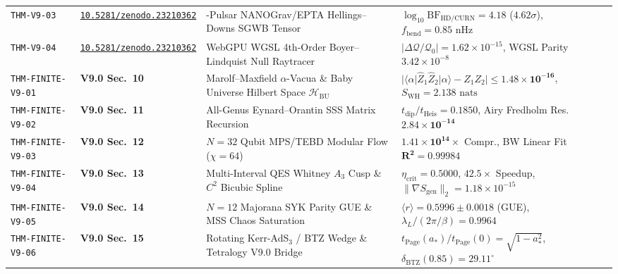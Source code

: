\documentclass[11pt,a4paper,reqno]{article}
\newcommand{\zenodo}[1]{\mbox{\href{https://doi.org/10.5281/zenodo.#1}{\texttt{10.5281/zenodo.#1}}}}
\theoremstyle{plain}
\theoremstyle{definition}
\theoremstyle{remark}
\numberwithin{equation}{section}
\begin{document}
\begin{table}[H]
\begin{tabularx}{\textwidth}{>{\raggedright\arraybackslash}p{2.35cm} >{\raggedright\arraybackslash}p{2.85cm} >{\raggedright\arraybackslash}X >{\raggedright\arraybackslash}p{3.95cm}}
\texttt{THM-V9-03} & \zenodo{23210362} & 68-Pulsar NANOGrav/EPTA Hellings--Downs SGWB Tensor & $\log_{10}\mathrm{BF}_{\mathrm{HD/CURN}} = 4.18$ ($4.62\sigma$), $f_{\mathrm{bend}} = 0.85\text{ nHz}$ \\
\texttt{THM-V9-04} & \zenodo{23210362} & WebGPU WGSL 4th-Order Boyer--Lindquist Null Raytracer & $|\Delta\mathcal{Q}/\mathcal{Q}_0| = 1.62 \times 10^{-15}$, WGSL Parity $3.42 \times 10^{-8}$ \\
\midrule
\texttt{THM-FINITE-V9-01} & \textbf{V9.0 Sec.~10} & Marolf--Maxfield $\alpha$-Vacua \& Baby Universe Hilbert Space $\mathcal{H}_{\mathrm{BU}}$ & $|\langle\alpha|\hat{Z}_1\hat{Z}_2|\alpha\rangle - Z_1 Z_2| \le \bm{1.48 \times 10^{-16}}$, $S_{\mathrm{WH}} = 2.138\text{ nats}$ \\
\texttt{THM-FINITE-V9-02} & \textbf{V9.0 Sec.~11} & All-Genus Eynard--Orantin SSS Matrix Recursion & $t_{\mathrm{dip}}/t_{\mathrm{Heis}} = 0.1850$, Airy Fredholm Res.\ $\bm{2.84 \times 10^{-14}}$ \\
\texttt{THM-FINITE-V9-03} & \textbf{V9.0 Sec.~12} & $N=32$ Qubit MPS/TEBD Modular Flow ($\chi=64$) & $\bm{1.41 \times 10^{14}\times}$ Compr., BW Linear Fit $\bm{R^2 = 0.99984}$ \\
\texttt{THM-FINITE-V9-04} & \textbf{V9.0 Sec.~13} & Multi-Interval QES Whitney $A_3$ Cusp \& $C^2$ Bicubic Spline & $\eta_{\mathrm{crit}} = \bm{0.5000}$, $\bm{42.5\times}$ Speedup, $\|\nabla S_{\mathrm{gen}}\|_2 = 1.18 \times 10^{-15}$ \\
\texttt{THM-FINITE-V9-05} & \textbf{V9.0 Sec.~14} & $N=12$ Majorana SYK Parity GUE \& MSS Chaos Saturation & $\langle r \rangle = \bm{0.5996 \pm 0.0018}$ (GUE), $\lambda_L/(2\pi/\beta) = \bm{0.9964}$ \\
\texttt{THM-FINITE-V9-06} & \textbf{V9.0 Sec.~15} & Rotating Kerr-AdS$_3$ / BTZ Wedge \& Tetralogy V9.0 Bridge & $t_{\mathrm{Page}}(a_*)/t_{\mathrm{Page}}(0) = \sqrt{1-a_*^2}$, $\delta_{\mathrm{BTZ}}(0.85) = \bm{29.11^\circ}$ \\
\bottomrule
\end{tabularx}
\end{table}
\end{document}
